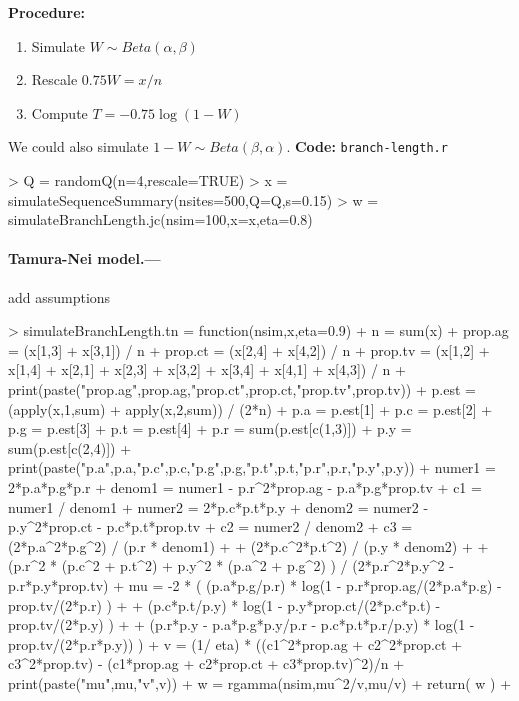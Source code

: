 \documentclass[12pt,letterpaper]{article}
\begin{document}
\textbf{Procedure:}
\begin{enumerate}
\item Simulate $W \sim Beta(\alpha,\beta)$
\item Rescale $0.75W=x/n$
\item Compute $T=-0.75 \log(1-W)$
\end{enumerate}
We could also simulate $1-W \sim Beta(\beta,\alpha)$.
\textbf{Code:} \texttt{branch-length.r}
\begin{Schunk}
\begin{Sinput}
> Q = randomQ(n=4,rescale=TRUE)
> x = simulateSequenceSummary(nsites=500,Q=Q,s=0.15)
> w = simulateBranchLength.jc(nsim=100,x=x,eta=0.8)
\end{Sinput}
\end{Schunk}


\paragraph{Tamura-Nei model.---}
add assumptions
\begin{Schunk}
\begin{Sinput}
> simulateBranchLength.tn = function(nsim,x,eta=0.9) {
+    n = sum(x)
+    prop.ag = (x[1,3] + x[3,1]) / n
+    prop.ct = (x[2,4] + x[4,2]) / n
+    prop.tv = (x[1,2] + x[1,4] + x[2,1] + x[2,3] + x[3,2] + x[3,4] + x[4,1] + x[4,3]) / n
+    print(paste("prop.ag",prop.ag,"prop.ct",prop.ct,"prop.tv",prop.tv))
+    p.est = (apply(x,1,sum) + apply(x,2,sum)) / (2*n)
+    p.a = p.est[1]
+    p.c = p.est[2]
+    p.g = p.est[3]
+    p.t = p.est[4]
+    p.r = sum(p.est[c(1,3)])
+    p.y = sum(p.est[c(2,4)])
+    print(paste("p.a",p.a,"p.c",p.c,"p.g",p.g,"p.t",p.t,"p.r",p.r,"p.y",p.y))
+    numer1 = 2*p.a*p.g*p.r
+    denom1 = numer1 - p.r^2*prop.ag - p.a*p.g*prop.tv
+    c1 = numer1 / denom1
+    numer2 = 2*p.c*p.t*p.y
+    denom2 = numer2 - p.y^2*prop.ct - p.c*p.t*prop.tv
+    c2 = numer2 / denom2
+    c3 = (2*p.a^2*p.g^2) / (p.r * denom1) +
+         (2*p.c^2*p.t^2) / (p.y * denom2) +
+         (p.r^2 * (p.c^2 + p.t^2) + p.y^2 * (p.a^2 + p.g^2) ) / (2*p.r^2*p.y^2 - p.r*p.y*prop.tv)
+    mu = -2 * ( (p.a*p.g/p.r) * log(1 - p.r*prop.ag/(2*p.a*p.g) - prop.tv/(2*p.r) ) +
+                (p.c*p.t/p.y) * log(1 - p.y*prop.ct/(2*p.c*p.t) - prop.tv/(2*p.y) ) +
+                (p.r*p.y - p.a*p.g*p.y/p.r - p.c*p.t*p.r/p.y) * log(1 - prop.tv/(2*p.r*p.y)) )
+    v = (1/ eta) * ((c1^2*prop.ag + c2^2*prop.ct + c3^2*prop.tv) - (c1*prop.ag + c2*prop.ct + c3*prop.tv)^2)/n
+    print(paste("mu",mu,"v",v))
+    w = rgamma(nsim,mu^2/v,mu/v)
+    return( w )
+}
\end{Sinput}
\end{Schunk}
\end{document}
